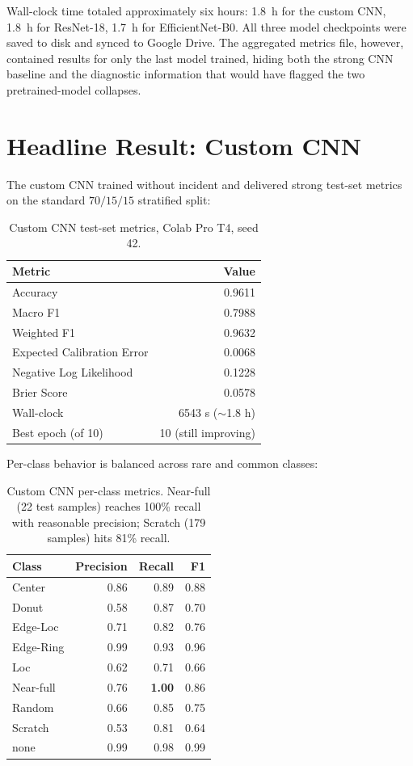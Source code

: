 \documentclass[conference]{IEEEtran}
\begin{document}
Wall-clock time totaled approximately six hours: 1.8~h for the custom CNN,
1.8~h for ResNet-18, 1.7~h for EfficientNet-B0. All three model checkpoints
were saved to disk and synced to Google Drive. The aggregated metrics file,
however, contained results for only the last model trained, hiding both the
strong CNN baseline and the diagnostic information that would have flagged
the two pretrained-model collapses.

\section{Headline Result: Custom CNN}

The custom CNN trained without incident and delivered strong test-set
metrics on the standard $70/15/15$ stratified split:

\begin{table}[H]
\centering
\begin{tabular}{lr}
\toprule
Metric & Value \\
\midrule
Accuracy        & 0.9611 \\
Macro F1        & 0.7988 \\
Weighted F1     & 0.9632 \\
Expected Calibration Error & 0.0068 \\
Negative Log Likelihood    & 0.1228 \\
Brier Score                & 0.0578 \\
Wall-clock                 & 6543 s ($\sim$1.8 h) \\
Best epoch (of 10)         & 10 (still improving) \\
\bottomrule
\end{tabular}
\caption{Custom CNN test-set metrics, Colab Pro T4, seed 42.}
\end{table}

Per-class behavior is balanced across rare and common classes:

\begin{table}[H]
\centering
\begin{tabular}{lrrr}
\toprule
Class & Precision & Recall & F1 \\
\midrule
Center      & 0.86 & 0.89 & 0.88 \\
Donut       & 0.58 & 0.87 & 0.70 \\
Edge-Loc    & 0.71 & 0.82 & 0.76 \\
Edge-Ring   & 0.99 & 0.93 & 0.96 \\
Loc         & 0.62 & 0.71 & 0.66 \\
Near-full   & 0.76 & \textbf{1.00} & 0.86 \\
Random      & 0.66 & 0.85 & 0.75 \\
Scratch     & 0.53 & 0.81 & 0.64 \\
none        & 0.99 & 0.98 & 0.99 \\
\bottomrule
\end{tabular}
\caption{Custom CNN per-class metrics. Near-full (22 test samples)
reaches 100\% recall with reasonable precision; Scratch (179 samples)
hits 81\% recall.}
\end{table}
\end{document}
